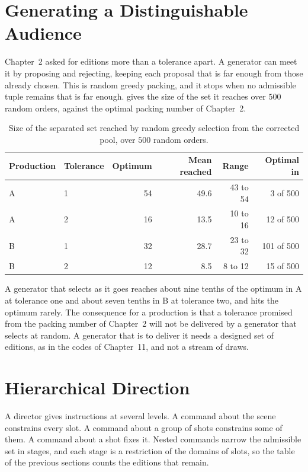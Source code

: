 \documentclass[11pt,twoside,openright]{book}
\theoremstyle{plain}
\theoremstyle{definition}
\theoremstyle{remark}
\begin{document}
\section{Generating a Distinguishable Audience}\label{sec:audience16}

Chapter~2 asked for editions more than a tolerance apart. A generator can meet it by proposing and rejecting, keeping each proposal that is far enough from those already chosen. This is random greedy packing, and it stops when no admissible tuple remains that is far enough.  gives the size of the set it reaches over $500$ random orders, against the optimal packing number of Chapter~2.

\begin{table}[ht]
\centering
\begin{tabular}{@{}llrrrr@{}}
\toprule
Production & Tolerance & Optimum & Mean reached & Range & Optimal in\\
\midrule
A & 1 & 54 & 49.6 & 43 to 54 & 3 of 500\\
A & 2 & 16 & 13.5 & 10 to 16 & 12 of 500\\
B & 1 & 32 & 28.7 & 23 to 32 & 101 of 500\\
B & 2 & 12 & 8.5 & 8 to 12 & 15 of 500\\
\bottomrule
\end{tabular}
\caption{Size of the separated set reached by random greedy selection from the corrected pool, over $500$ random orders.}\label{tab:greedy16}
\end{table}

A generator that selects as it goes reaches about nine tenths of the optimum in A at tolerance one and about seven tenths in B at tolerance two, and hits the optimum rarely. The consequence for a production is that a tolerance promised from the packing number of Chapter~2 will not be delivered by a generator that selects at random. A generator that is to deliver it needs a designed set of editions, as in the codes of Chapter~11, and not a stream of draws.

\section{Hierarchical Direction}\label{sec:direct16}

A director gives instructions at several levels. A command about the scene constrains every slot. A command about a group of shots constrains some of them. A command about a shot fixes it. Nested commands narrow the admissible set in stages, and each stage is a restriction of the domains of slots, so the table of the previous sections counts the editions that remain.
\end{document}
